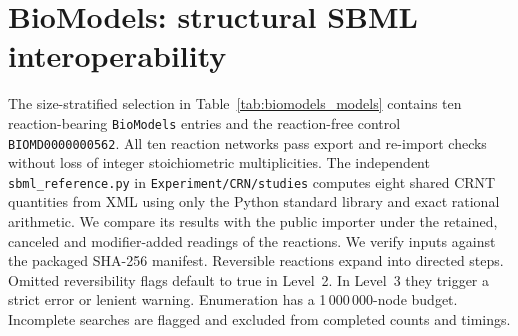 \documentclass[10pt,a4paper,fleqn]{article}
\theoremstyle{plain}\newtheorem{theorem}{Theorem}
\begin{document}
\section{BioModels: structural SBML interoperability}
\label{si:biomodels}

The size-stratified selection in Table~\ref{tab:biomodels_models} contains ten reaction-bearing \texttt{BioModels} entries and the reaction-free control \texttt{BIOMD0000000562}. All ten reaction networks pass export and re-import checks without loss of integer stoichiometric multiplicities. The independent \texttt{sbml\_reference.py} in \texttt{Experiment/CRN/studies} computes eight shared CRNT quantities from XML using only the Python standard library and exact rational arithmetic. We compare its results with the public importer under the retained, canceled and modifier-added readings of the reactions. We verify inputs against the packaged SHA-256 manifest. Reversible reactions expand into directed steps. Omitted reversibility flags default to true in Level~2. In Level~3 they trigger a strict error or lenient warning. Enumeration has a 1\,000\,000-node budget. Incomplete searches are flagged and excluded from completed counts and timings.
\end{document}
